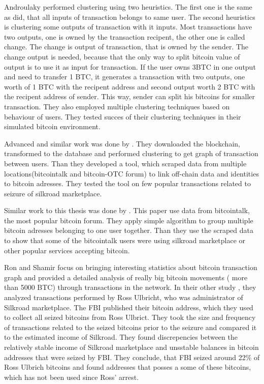 \documentclass[
  digital, %
  table,   %
  lof,     %
  lot,     %
  oneside
]{fithesis3}
\begin{document}
Androulaky \parencite{androulaki2013evaluating} performed clustering using two heuristics.
The first one is the same as \parencite{reid2013analysis} did, that all inputs of transaction
belongs to same user. The second heuristics is clustering some outputs of transaction with it inputs.
Most transactions have two outputs, one is owned by the transaction recipent,
the other one is called change. The change is output of transaction, that is owned by
the sender. The change output is needed, because that the only way to split
 bitcoin value of output is to use it as input for transaction.
 If the user owns 3BTC in one output and need to transfer 1 BTC, it generates a transaction
 with two outputs, one worth of 1 BTC with the recipent address and second output worth 2 BTC 
 with the recipent address of sender. This way, sender can split his bitcoins for smaller transaction.
 They also employed multiple clustering techniques based on behaviour of users.
 They tested succes of their clustering techniques in their simulated bitcoin 
 environment.

Advanced and similar work was done by \parencite{spagnuolo2014bitiodine}. They downloaded the blockchain, transformed to the database
and performed clustering to get graph of transaction between users.
Than they developed a tool, which scraped data from multiple locations(bitcointalk and bitcoin-OTC forum) to link off-chain data and identities to bitcoin adresses.
They tested the tool on few popular transactions related to seizure of silkroad marketplace.

Similar work to this thesis was done by \parencite{fleder2015bitcoin}.
This paper use data from bitcointalk, the most popular bitcoin forum. 
They apply simple algorithm to group multiple bitcoin adresses belonging to one user together.
Than they use the scraped data to show
that some of the bitcointalk users were using silkroad marketplace or other popular services accepting bitcoin.
 
Ron and Shamir \parencite{ron2013quantitative} focus on bringing
interesting statistics about bitcoin transaction graph
and provided a detailed analysis of really big bitcoin movements ( more than 5000 BTC) 
through transactions in the network.
In their other study \parencite{ron2014did}, they analyzed transactions performed by Ross Ulbricht,
who was administrator of Silkroad marketplace.
The FBI published their bitcoin address, which they used to collect all seized bitcoins from Ross Ulbrict.
They took the size and frequency of transactions related to the seized bitcoins prior to the seizure and compared 
it to the estimated income of Silkroad. They found discrepencies between the
relatively stable income of Silkroad marketplace and unsstable balances in bitcoin addresses
that were seized by FBI. They conclude, that FBI seized around 22\% of Ross Ulbrich bitcoins
and found addresses that posses a some of these bitcoins, which has not been used since Ross' arrest.
\end{document}
